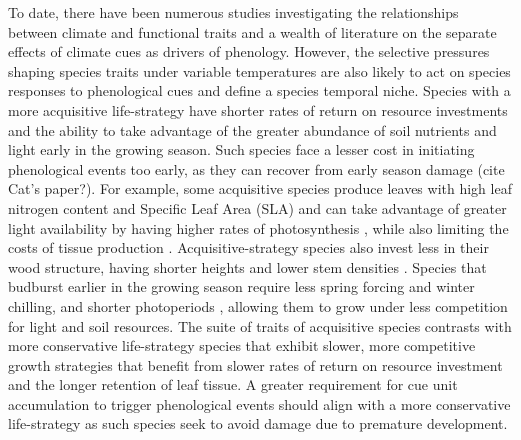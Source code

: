 \documentclass{article}\usepackage[]{graphicx}\usepackage[]{color}
\begin{document}

To date, there have been numerous studies investigating the relationships between climate and functional traits and a wealth of literature on the separate effects of climate cues as drivers of phenology. However, the selective pressures shaping species traits under variable temperatures are also likely to act on species responses to phenological cues and define a species temporal niche. Species with a more acquisitive life-strategy have shorter rates of return on resource investments and the ability to take advantage of the greater abundance of soil nutrients and light early in the growing season. Such species face a lesser cost in initiating phenological events too early, as they can recover from early season damage (cite Cat's paper?). For example, some acquisitive species produce leaves with high leaf nitrogen content and Specific Leaf Area (SLA) and can take advantage of greater light availability by having higher rates of photosynthesis \citep{Wright2004,Pereira2020}, while also limiting the costs of tissue production \citep{Lambers2004, Westoby2006, Herault2011}. Acquisitive-strategy species also invest less in their wood structure, having shorter heights and lower stem densities \citep{Laughlin2010}. Species that budburst earlier in the growing season require less spring forcing and winter chilling, and shorter photoperiods \citep{Flynn2018}, allowing them to grow under less competition for light and soil resources. The suite of traits of acquisitive species contrasts with more conservative life-strategy species that exhibit slower, more competitive growth strategies that benefit from slower rates of return on resource investment and the longer retention of leaf tissue. A greater requirement for cue unit accumulation to trigger phenological events should align with a more conservative life-strategy as such species seek to avoid damage due to premature development.      
 
   
\end{document}
